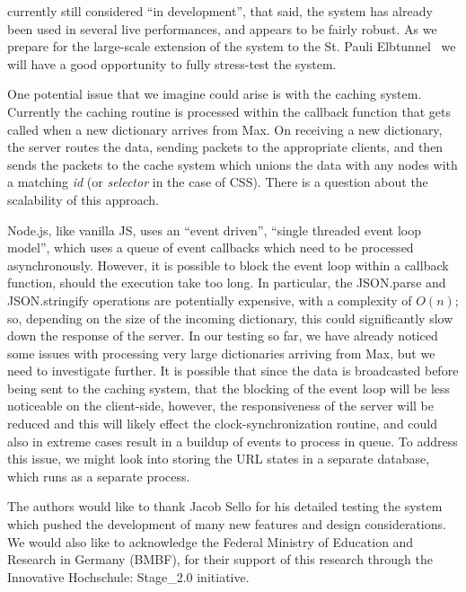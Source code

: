 \drawsocket currently still considered ``in development'', that said, the system has already been used in several live performances, and appears to be fairly robust.
As we prepare for the large-scale extension of the system to the St. Pauli Elbtunnel~\cite{elbtunnel19} we will have a good opportunity to fully stress-test the system.

One potential issue that we imagine could arise is with the caching system. 
Currently the caching routine is processed within the callback function that gets called when a new dictionary arrives from Max.
On receiving a new dictionary, the server routes the data, sending packets to the appropriate clients, and then sends the packets to the cache system which unions the data with any nodes with a matching \textit{id} (or \textit{selector} in the case of CSS).
There is a question about the scalability of this approach. 

Node.js, like vanilla JS, uses an ``event driven'', ``single threaded event loop model'', which uses a queue of event callbacks which need to be processed asynchronously.
However, it is possible to block the event loop\cite{node-eventloop} within a callback function, should the execution take too long.
In particular, the JSON.parse and JSON.stringify operations are potentially expensive, with a complexity of $O(n)$; so, depending on the size of the incoming dictionary, this could significantly slow down the response of the server.
In our testing so far, we have already noticed some issues with processing very large dictionaries arriving from Max, but we need to investigate further.
It is possible that since the data is broadcasted before being sent to the caching system, that the blocking of the event loop will be less noticeable on the client-side, however, the responsiveness of the server will be reduced and this will likely effect the clock-synchronization routine, and could also in extreme cases result in a buildup of events to process in queue.
To address this issue, we might look into storing the URL states in a separate database, which runs as a separate process.


\begin{acknowledgments}
The authors would like to thank Jacob Sello for his detailed testing the system which pushed the development of many new features and design considerations. We would also like to acknowledge the Federal Ministry of Education and Research in Germany (BMBF), for their support of this research through the Innovative Hochschule: Stage\_2.0 initiative.
\end{acknowledgments} 

\balance







